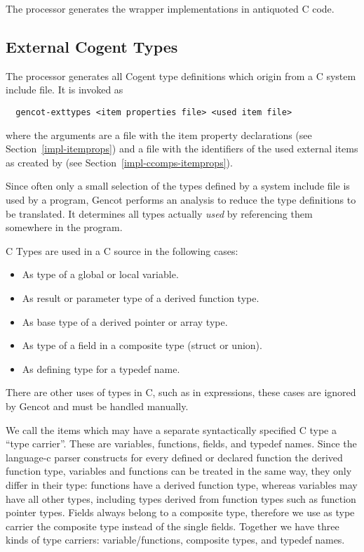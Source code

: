 The processor  generates the wrapper implementations in antiquoted C code.

\subsection{External Cogent Types}
\label{impl-ccomps-exttypes}

The processor  generates all Cogent type definitions which origin from a C system include file.
It is invoked as
\begin{verbatim}
  gencot-exttypes <item properties file> <used item file>
\end{verbatim}
where the arguments are a file with the item property declarations (see 
Section~\ref{impl-itemprops}) and a file with the identifiers of the used external items as created 
by  (see Section~\ref{impl-ccomps-itemprops}).

Since often only a small selection of the types defined by a system include file is used by a program, Gencot performs 
an analysis to reduce the type definitions to be translated. It determines all types actually \textit{used} by
referencing them somewhere in the program.

C Types are used in a C source in the following cases:
\begin{itemize}
\item As type of a global or local variable.
\item As result or parameter type of a derived function type.
\item As base type of a derived pointer or array type.
\item As type of a field in a composite type (struct or union).
\item As defining type for a typedef name.
\end{itemize}
There are other uses of types in C, such as in  expressions, these cases are ignored by Gencot and 
must be handled manually.

We call the items which may have a separate syntactically
specified C type a ``type carrier''. These are variables, functions, fields, and typedef names. Since the language-c
parser constructs for every defined or declared function the derived function type, variables and functions
can be treated in the same way, they only differ in their type: functions have a derived function type, whereas
variables may have all other types, including types derived from function types such as function pointer types. Fields 
always belong to a composite type, therefore we use as type carrier the composite type instead of the single fields.
Together we have three kinds of type carriers: variable/functions, composite types, and typedef names.


